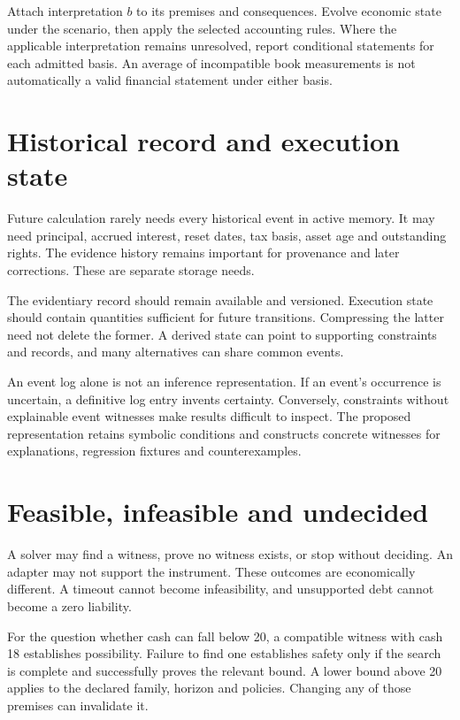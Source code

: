 Attach interpretation $b$ to its premises and consequences. Evolve economic state under the scenario, then apply the selected accounting rules. Where the applicable interpretation remains unresolved, report conditional statements for each admitted basis. An average of incompatible book measurements is not automatically a valid financial statement under either basis.

\section{Historical record and execution state}
Future calculation rarely needs every historical event in active memory. It may need principal, accrued interest, reset dates, tax basis, asset age and outstanding rights. The evidence history remains important for provenance and later corrections. These are separate storage needs.

The evidentiary record should remain available and versioned. Execution state should contain quantities sufficient for future transitions. Compressing the latter need not delete the former. A derived state can point to supporting constraints and records, and many alternatives can share common events.

An event log alone is not an inference representation. If an event's occurrence is uncertain, a definitive log entry invents certainty. Conversely, constraints without explainable event witnesses make results difficult to inspect. The proposed representation retains symbolic conditions and constructs concrete witnesses for explanations, regression fixtures and counterexamples.

\section{Feasible, infeasible and undecided}
A solver may find a witness, prove no witness exists, or stop without deciding. An adapter may not support the instrument. These outcomes are economically different. A timeout cannot become infeasibility, and unsupported debt cannot become a zero liability.

For the question whether cash can fall below 20, a compatible witness with cash 18 establishes possibility. Failure to find one establishes safety only if the search is complete and successfully proves the relevant bound. A lower bound above 20 applies to the declared family, horizon and policies. Changing any of those premises can invalidate it.

